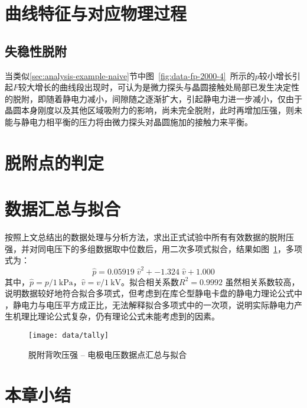 \clearpage



\section{曲线特征与对应物理过程}\label{sec:analysis-feature}




\subsection{失稳性脱附}\label{sec:analysis-feature-destabilize}

当类似\ref{sec:analysis-example-naive}节中图~\ref{fig:data-fp-2000-4}~所示的$p$较小增长引起$F$较大增长的曲线段出现时，可认为是微力探头与晶圆接触处局部已发生决定性的脱附，即随着静电力减小，间隙随之逐渐扩大，引起静电力进一步减小，仅由于晶圆本身刚度以及其他区域吸附力的影响，尚未完全脱附，此时再增加压强，则未能与静电力相平衡的压力将由微力探头对晶圆施加的接触力来平衡。




\section{脱附点的判定}\label{sec:analysis-criterion}





\section{数据汇总与拟合}\label{sec:analysis-tally}

按照上文总结出的数据处理与分析方法，求出正式试验中所有有效数据的脱附压强，并对同电压下的多组数据取中位数\footnotemark{}后，用二次多项式拟合，结果如图~\ref{fig:data-tally}，多项式为：
\[
\hat{p} = 0.05919\;\hat{v}^2 + -1.324\;\hat{v} + 1.000
\]
其中，$\hat{p} = p / \SI{1}{\kPa}$，$\hat{v} = v / \SI{1}{\kV}$。拟合相关系数$R^2 = \num{0.9992}$
虽然相关系数较高，说明数据较好地符合拟合多项式，但考虑到在库仑型静电卡盘的静电力理论公式中
，静电力与电压平方成正比，无法解释拟合多项式中的一次项，说明实际静电力产生机理比理论公式复杂，仍有理论公式未能考虑到的因素。


\begin{figure}[thbp]
\centering
\texttt{[image: data/tally]}
\caption{脱附背吹压强 -- 电极电压数据点汇总与拟合}
\label{fig:data-tally}
\end{figure}



\section{本章小结}\label{sec:analysis-summary}


